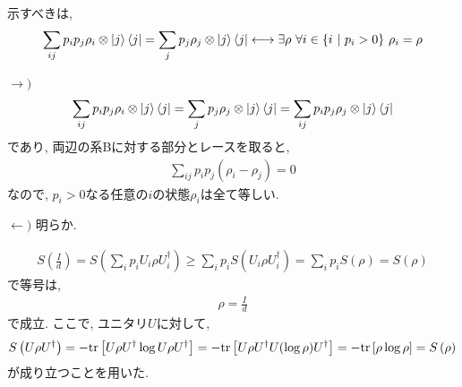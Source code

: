 \begin{ex}
    \label{ex11.17}
\end{ex}

\begin{ex}
    \label{ex11.18}
    示すべきは,
    \begin{align*}
        \sum_{ij} p_i p_j \rho_i \otimes \ket{j}\bra{j}
        =
        \sum_{j} p_j \rho_j \otimes \ket{j}\bra{j}
        \longleftrightarrow
        \exists \rho \ \forall i \in \{ i \ |\  p_i > 0 \} \ \rho_i = \rho
    \end{align*}
    \par
    $\longrightarrow)$
    \begin{align*}
        \sum_{ij} p_i p_j \rho_i \otimes \ket{j}\bra{j}
        =
        \sum_{j} p_j \rho_j \otimes \ket{j}\bra{j}
        =
        \sum_{ij} p_i p_j \rho_j \otimes \ket{j}\bra{j}
    \end{align*}
    であり, 両辺の系Bに対する部分とレースを取ると,
    \begin{align*}
        \sum_{ij} p_i p_j (\rho_i - \rho_j) = 0
    \end{align*}
    なので, $p_i > 0$なる任意の$i$の状態$\rho_i$は全て等しい.
    \par
    $\longleftarrow)$
    明らか.
\end{ex}


\begin{ex}
    \label{ex11.19}
    \begin{align*}
        S \left( \frac{I}{d}\right)
        =
        S \left( \sum_i p_i U_i \rho U_i^\dagger \right)
        \geq
        \sum_i p_i S \left( U_i \rho U_i^\dagger \right)
        =
        \sum_i p_i S\left( \rho \right)
        =
        S\left( \rho \right)
    \end{align*}
    で等号は,
    \begin{align*}
        \rho = \frac{I}{d}
    \end{align*}
    で成立. ここで, ユニタリ$U$に対して,
    \begin{align*}
        S \left( U \rho U^\dagger \right)
        =
        - \mathrm{tr} \left[ U \rho U^\dagger \log U \rho U^\dagger\right]
        =
        - \mathrm{tr} \left[ U \rho U^\dagger U (\log \rho) U^\dagger\right]
        =
        - \mathrm{tr} \left[ \rho \log \rho\right]
        =
        S \left( \rho\right)
    \end{align*}
    が成り立つことを用いた.
\end{ex}

\begin{ex}
    \label{ex11.20}
\end{ex}

